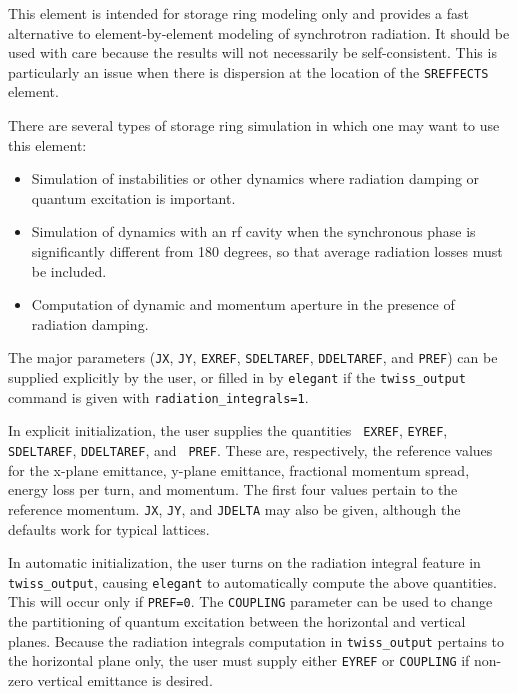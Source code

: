 This element is intended for storage ring modeling only and 
provides a fast alternative to element-by-element modeling of synchrotron radiation.
It should be used with care because the results will not necessarily be self-consistent.
This is particularly an issue when there is dispersion at the location of the \verb|SREFFECTS|
element.

There are several types of storage ring simulation in which one may want to use this element:
\begin{itemize}
\item Simulation of instabilities or other dynamics where radiation damping or quantum excitation is important.
\item Simulation of dynamics with an rf cavity when the synchronous phase is significantly
  different from 180 degrees, so that average radiation losses must be included.
\item Computation of dynamic and momentum aperture in the presence of radiation damping.
\end{itemize}

The major parameters (\verb|JX|, \verb|JY|, \verb|EXREF|, \verb|SDELTAREF|,
\verb|DDELTAREF|, and \verb|PREF|) can be supplied explicitly by the user, or filled in by {\tt elegant}
if the \verb|twiss_output| command is given with \verb|radiation_integrals=1|.

In explicit initialization, the user supplies the quantities {\tt
EXREF}, {\tt EYREF}, {\tt SDELTAREF}, {\tt DDELTAREF}, and {\tt
PREF}.  These are, respectively, the reference values for the x-plane
emittance, y-plane emittance, fractional momentum spread, energy loss
per turn, and momentum.  The first four values pertain to the
reference momentum.  {\tt JX}, {\tt JY}, and {\tt JDELTA} may also
be given, although the defaults work for typical lattices.

In automatic initialization, the user turns on the radiation integral
feature in {\tt twiss\_output}, causing {\tt elegant} to automatically
compute the above quantities.  This will occur only if {\tt PREF=0}.
The {\tt COUPLING} parameter can be used to change the partitioning of
quantum excitation between the horizontal and vertical planes.
Because the radiation integrals computation in \verb|twiss_output| pertains to the
horizontal plane only, the user must supply either \verb|EYREF| or \verb|COUPLING| if
non-zero vertical emittance is desired.

